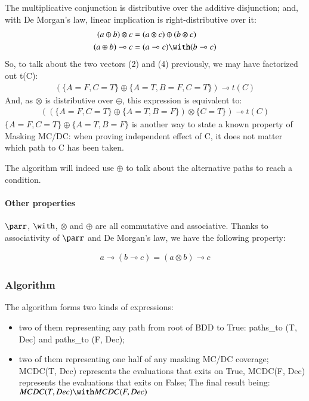 \documentclass[a4paper,12pt,twoside]{article}
\begin{document}
The multiplicative conjunction is distributive over the additive
disjunction; and, with De Morgan's law, linear implication is
right-distributive over it:
\begin{align*}
  (a \oplus b) \otimes c & = (a \otimes c) \oplus (b \otimes c)\\
  (a \oplus b) \multimap c & = (a \multimap c) \with (b \multimap c)
\end{align*}
So, to talk about the two vectors (2) and (4) previously, we may have
factorized out t(C):
\begin{align*}
  (\{A=F, C=T\} \oplus \{A=T, B=F, C=T\}) \multimap t(C)
\end{align*}
And, as $\otimes$ is distributive over $\oplus$, this expression is
equivalent to:
\begin{align*}
  ((\{A=F, C=T\} \oplus \{A=T, B=F\}) \otimes \{C=T\}) \multimap t(C)
\end{align*}
$\{A=F, C=T\} \oplus \{A=T, B=F\}$ is another way to state a known property of
Masking MC/DC: when proving independent effect of C, it does not
matter which path to C has been taken.

The algorithm will indeed use $\oplus$ to talk about the alternative paths to
reach a condition.

\paragraph{Other properties}

$\parr$, $\with$, $\otimes$ and $\oplus$ are all commutative and
associative. Thanks to associativity of $\parr$ and De Morgan's law,
we have the following property:

\begin{align*}
 a \multimap (b \multimap c) = (a \otimes b) \multimap c
\end{align*}

\subsubsection{Algorithm}

The algorithm forms two kinds of expressions:
\begin{itemize}
\item two of them representing any path from root of BDD to True:
  paths\_to (T, Dec) and paths\_to (F, Dec);
\item two of them representing one half of any masking MC/DC coverage;
  MCDC(T, Dec) represents the evaluations that exits on True,
  MCDC(F, Dec) represents the evaluations that exits on False;
  The final result being: $MCDC(T, Dec) \with MCDC(F,Dec)$
\end{itemize}
\end{document}
